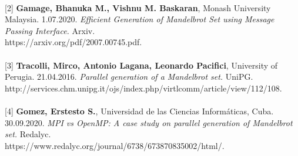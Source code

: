 \documentclass[a4paper,11pt]{article}
\begin{document}
\paragraph{}[2] \textbf{Gamage, Bhanuka M., Vishnu M. Baskaran}, Monash University Malaysia. 1.07.2020. \emph{Efficient Generation of Mandelbrot Set using Message Passing Interface.} Arxiv. \\https://arxiv.org/pdf/2007.00745.pdf.
\paragraph{}[3] \textbf{Tracolli, Mirco, Antonio Lagana, Leonardo Pacifici}, University of Perugia. 21.04.2016. \emph{Parallel generation of a Mandelbrot set.} UniPG. \\http://services.chm.unipg.it/ojs/index.php/virtlcomm/article/view/112/108.
\paragraph{}[4] \textbf{Gomez, Erstesto S.}, Universidad de las Ciencias Informáticas, Cuba. 30.09.2020. \emph{MPI vs OpenMP: A case study on parallel generation of Mandelbrot set.} Redalyc. \\https://www.redalyc.org/journal/6738/673870835002/html/.
\cleardoublepage
{}
\listoffigures
{}
\listoftables
{}
\lstlistoflistings{}
\end{document}
